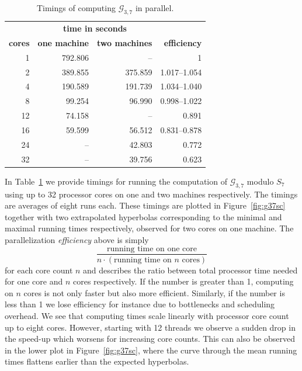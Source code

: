 \documentclass[
  paper=a4,
  titlepage,
  bibliography=totoc,
  pagesize=pdftex
]{scrartcl}
\numberwithin{figure}{section}
\numberwithin{equation}{section}
\numberwithin{table}{section}
\theoremstyle{definition}
\numberwithin{definition}{section}
\begin{document}
\begin{table}[tbh]
  \centering
  \begin{tabular}{r||r|r||r}
                   & \multicolumn{2}{c||}{\textbf{time in seconds}} &\\
    \textbf{cores} & \textbf{one machine} & \textbf{two machines} &
    \textbf{efficiency} \\ \hline
    1   & 792.806 &      -- & 1 \\
    2   & 389.855 & 375.859 & 1.017--1.054 \\
    4   & 190.589 & 191.739 & 1.034--1.040 \\
    8   &  99.254 &  96.990 & 0.998--1.022 \\
    12  &  74.158 &      -- & 0.891 \\
    16  &  59.599 &  56.512 & 0.831--0.878 \\
    24  &      -- &  42.803 & 0.772 \\
    32  &      -- &  39.756 & 0.623
  \end{tabular}
  \caption{Timings of computing $\mathcal G_{3,7}$ in parallel.}
  \label{tab:g37}
\end{table}

In Table~\ref{tab:g37} we provide timings for running the computation of $\mathcal
G_{3,7}$ modulo $S_7$ using up to 32 processor cores on one and two machines respectively.
The timings are averages of eight runs each. These timings are plotted in
Figure~\ref{fig:g37sc} together with two extrapolated hyperbolas corresponding to the
minimal and maximal running times respectively, observed for two cores on one machine. The
parallelization \emph{efficiency} above is simply
\[
  \frac{ \text{running time on one core} }{ n \cdot (\text{running time on $n$ cores})}
\]
for each core count $n$ and describes the ratio between total processor time needed for
one core and $n$ cores respectively. If the number is greater than 1, computing on $n$
cores is not only faster but also more efficient. Similarly, if the number is less than 1
we lose efficiency for instance due to bottlenecks and scheduling overhead. We see that
computing times scale linearly with processor core count up to eight cores. However,
starting with 12 threads we observe a sudden drop in the speed-up which worsens for
increasing core counts. This can also be observed in the lower plot in
Figure~\ref{fig:g37sc}, where the curve through the mean running times flattens earlier
than the expected hyperbolas.
\end{document}
